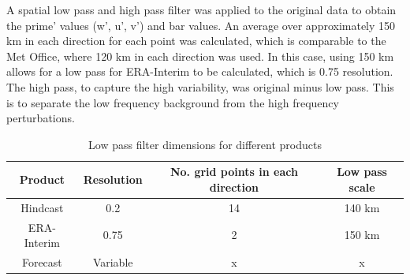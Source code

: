 
A spatial low pass and high pass filter was applied to the original data to obtain the prime' values (w', u', v') and bar values. An average over approximately 150 km in each direction for each point was calculated, which is comparable to the Met Office, where 120 km in each direction was used. In this case, using 150 km allows for a low pass for ERA-Interim to be calculated, which is 0.75 resolution. The high pass, to capture the high variability, was original minus low pass. This is to separate the low frequency background from the high frequency perturbations.


\begin{table}[h]
	\caption{Low pass filter dimensions for different products}\label{t_lowpass}
	\begin{center}
		\begin{tabular}{cccc}
			\hline\hline
			Product & Resolution & No. grid points in each direction & Low pass scale \\
			\hline
			Hindcast & 0.2 & 14 & 140 km \\ 
			ERA-Interim & 0.75  & 2 & 150 km \\
			Forecast & Variable &  x & x \\			
			
			\hline
		\end{tabular}
	\end{center}
\end{table}



